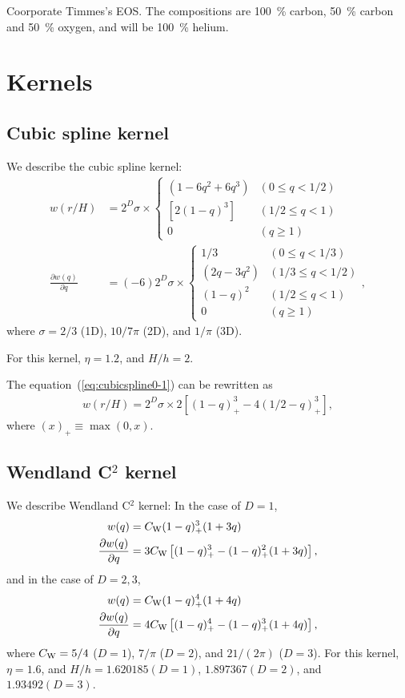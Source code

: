 \documentclass[fleqn,dvipdfmx]{article}
\begin{document}
Coorporate Timmes's EOS. The compositions are 100~\% carbon, 50~\%
carbon and 50~\% oxygen, and will be 100~\% helium.

\appendix

\section{Kernels}
\label{sec:kernels}

\subsection{Cubic spline kernel}

We describe the cubic spline kernel:
\begin{align}
  w(r/H) &= 2^D \sigma \times \left\{
  \begin{array}{ll}
    \left( 1 - 6 q^2 + 6 q^3 \right) & (0 \le q < 1/2) \\
    \left[ 2 (1 - q)^3 \right] & (1/2 \le q < 1) \\
    0 & (q \ge 1)
  \end{array}
  \right. \label{eq:cubicspline0-1} \\
  \frac{\partial w(q)}{\partial q} &= (-6) 2^D \sigma
  \times \left\{
  \begin{array}{ll}
    1/3 & (0 \le q < 1/3) \\
    \left(2q - 3q^2 \right) & (1/3 \le q < 1/2) \\
    (1 - q)^2 & (1/2 \le q < 1) \\
    0 & (q \ge 1)
  \end{array}
  \right., \label{eq:cubicspline0-2}
\end{align}
where $\sigma = 2/3$ (1D), $10/7\pi$ (2D), and $1/\pi$ (3D).

For this kernel, $\eta=1.2$, and $H/h=2$.

The equation~(\ref{eq:cubicspline0-1}) can be rewritten as
\begin{align}
  w(r/H) = 2^D \sigma \times 2 \left[ (1-q)^3_+ - 4 (1/2 - q)^3_+ \right],
\end{align}
where $(x)_+ \equiv \max(0, x)$.

\subsection{Wendland C$^2$ kernel}

We describe Wendland C$^2$ kernel: In the case of $D = 1$,
\begin{align}
  w(q) &= C_{\rm W} (1-q)_+^3 (1+3q) \\ \frac{\partial w(q)}{\partial
    q} &= 3 C_{\rm W} \left[(1-q)^3_+ - (1-q)^2_+ (1+3q) \right],
\end{align}
and in the case of $D = 2, 3$,
\begin{align}
  w(q) &= C_{\rm W} (1-q)_+^4 (1+4q) \\ \frac{\partial w(q)}{\partial
    q} &= 4 C_{\rm W} \left[(1-q)^4_+ - (1-q)^3_+ (1+4q) \right],
\end{align}
where $C_{\rm W}=5/4$ ($D=1$), $7/\pi$ ($D=2$), and $21/(2\pi)$
($D=3$). For this kernel, $\eta=1.6$, and $H/h=1.620185(D=1)$,
$1.897367(D=2)$, and $1.93492(D=3)$.
\end{document}
